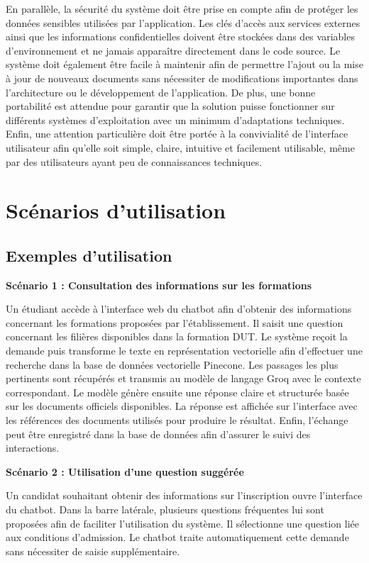 \documentclass[12pt,a4paper]{report}
\begin{document}
En parallèle, la sécurité du système doit être prise en compte afin de protéger les données sensibles utilisées par l’application. Les clés d’accès aux services externes ainsi que les informations confidentielles doivent être stockées dans des variables d’environnement et ne jamais apparaître directement dans le code source. Le système doit également être facile à maintenir afin de permettre l’ajout ou la mise à jour de nouveaux documents sans nécessiter de modifications importantes dans l’architecture ou le développement de l’application. De plus, une bonne portabilité est attendue pour garantir que la solution puisse fonctionner sur différents systèmes d’exploitation avec un minimum d’adaptations techniques. Enfin, une attention particulière doit être portée à la convivialité de l’interface utilisateur afin qu’elle soit simple, claire, intuitive et facilement utilisable, même par des utilisateurs ayant peu de connaissances techniques.

\section{Scénarios d'utilisation}
\subsection{Exemples d'utilisation}

\textbf{Scénario 1 : Consultation des informations sur les formations}

Un étudiant accède à l’interface web du chatbot afin d’obtenir des informations concernant les formations proposées par l’établissement. Il saisit une question concernant les filières disponibles dans la formation DUT. 
\newpage
Le système reçoit la demande puis transforme le texte en représentation vectorielle afin d’effectuer une recherche dans la base de données vectorielle Pinecone. Les passages les plus pertinents sont récupérés et transmis au modèle de langage Groq avec le contexte correspondant. Le modèle génère ensuite une réponse claire et structurée basée sur les documents officiels disponibles. La réponse est affichée sur l’interface avec les références des documents utilisés pour produire le résultat. Enfin, l’échange peut être enregistré dans la base de données afin d’assurer le suivi des interactions.

\bigskip

\textbf{Scénario 2 : Utilisation d’une question suggérée}

Un candidat souhaitant obtenir des informations sur l’inscription ouvre l’interface du chatbot. Dans la barre latérale, plusieurs questions fréquentes lui sont proposées afin de faciliter l’utilisation du système. Il sélectionne une question liée aux conditions d’admission. Le chatbot traite automatiquement cette demande sans nécessiter de saisie supplémentaire.
\newline
\end{document}
